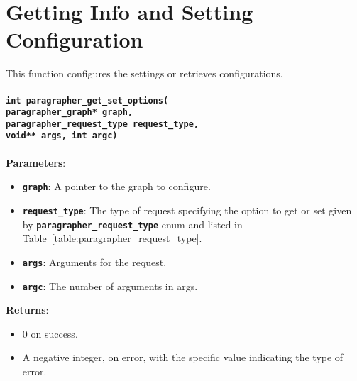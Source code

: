\documentclass[a4paper]{article}
\begin{document}
\section{Getting Info and Setting Configuration}
This function configures the settings or retrieves configurations.
~\\
\\
\texttt{\textbf{int paragrapher\_get\_set\_options(
\\{\indent}paragrapher\_graph* graph, 
\\{\indent}paragrapher\_request\_type request\_type,
\\{\indent}void** args, int argc)}}
\\
\\
\textbf{Parameters}:
\begin{itemize}
    \setlength{\itemsep}{0pt}
    \setlength{\parskip}{0pt}
    \setlength{\parsep}{0pt}

    \item \textbf{\texttt{graph}}: A pointer to the graph to configure.
    \item \textbf{\texttt{request\_type}}: The type of request specifying the option to get or set given by \textbf{\texttt{paragrapher\_request\_type}} enum and listed in  Table~\ref{table:paragrapher_request_type}.
    \item \textbf{\texttt{args}}: Arguments for the request.
    \item \textbf{\texttt{argc}}: The number of arguments in args.
\end{itemize}
\textbf{Returns}:
\begin{itemize}
    \setlength{\itemsep}{0pt}
    \setlength{\parskip}{0pt}
    \setlength{\parsep}{0pt}

    \item 0 on success.
    \item A negative integer, on error, with the specific value indicating the type of error.
\end{itemize}
\end{document}
